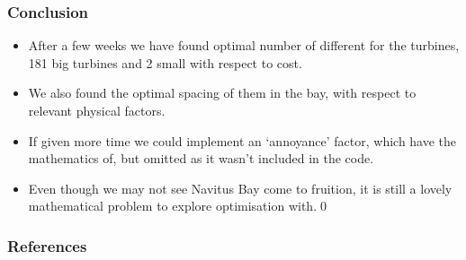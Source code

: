\documentclass{beamer}
\begin{document}
\begin{frame}
  \frametitle{Conclusion}
  \begin{itemize}
    \item After a few weeks we have found optimal number of different for the turbines, 181 big turbines and 2 small with respect to cost. \\\pause
    \item We also found the optimal spacing of them in the bay, with respect to relevant physical factors.\\\pause
    \item If given more time we could implement an `annoyance' factor, which have the mathematics of, but omitted as it wasn't included in the code. \\\pause
    \item Even though we may not see Navitus Bay come to fruition, it is still a lovely mathematical problem to explore optimisation with.\qed
  \end{itemize}
\end{frame}

\begin{frame}
  \frametitle{References}
  \printbibliography
\end{frame}
\end{document}
